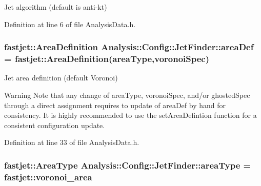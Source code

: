 Jet algorithm (default is anti-\/kt) 



Definition at line 6 of file Analysis\+Data.\+h.

\subsubsection[{\texorpdfstring{area\+Def}{areaDef}}]{\setlength{\rightskip}{0pt plus 5cm}fastjet\+::\+Area\+Definition Analysis\+::\+Config\+::\+Jet\+Finder\+::area\+Def = fastjet\+::\+Area\+Definition({\bf area\+Type},{\bf voronoi\+Spec})\hspace{0.3cm}{\ttfamily [static]}}\hypertarget{namespaceAnalysis_1_1Config_1_1JetFinder_a2b26c98f62ad8322f8f593fc0dea22af}{}\label{namespaceAnalysis_1_1Config_1_1JetFinder_a2b26c98f62ad8322f8f593fc0dea22af}


Jet area definition (default Voronoi) 

\begin{DoxyWarning}{Warning}
Note that any change of {\ttfamily area\+Type}, {\ttfamily voronoi\+Spec}, and/or {\ttfamily ghosted\+Spec} through a direct assignment requires to update of {\ttfamily area\+Def} by hand for consistency. It is highly recommended to use the {\ttfamily set\+Area\+Defintion} function for a consistent configuration update. 
\end{DoxyWarning}


Definition at line 33 of file Analysis\+Data.\+h.

\subsubsection[{\texorpdfstring{area\+Type}{areaType}}]{\setlength{\rightskip}{0pt plus 5cm}fastjet\+::\+Area\+Type Analysis\+::\+Config\+::\+Jet\+Finder\+::area\+Type = fastjet\+::voronoi\+\_\+area\hspace{0.3cm}{\ttfamily [static]}}\hypertarget{namespaceAnalysis_1_1Config_1_1JetFinder_a42b6e6b7c1bebe8646790c377d569664}{}\label{namespaceAnalysis_1_1Config_1_1JetFinder_a42b6e6b7c1bebe8646790c377d569664}


